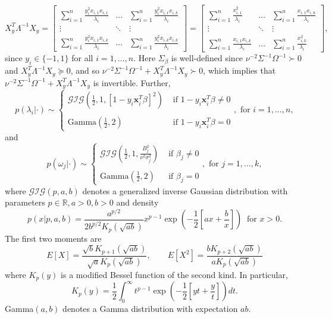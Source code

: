 \documentclass[12pt]{article}
\begin{document}
\begin{equation}
  X_{y}^T \Lambda^{-1} X_{y} = \begin{bmatrix}
    \sum_{i=1}^{n}\frac{y_i^2 x_{i,1}x_{i,1}}{\lambda_i} & \dots & \sum_{i=1}^{n}\frac{ y_i^2 x_{i,1}x_{i,k}}{\lambda_i} \\
    \vdots & \ddots & \vdots \\
    \sum_{i=1}^{n} \frac{y_i^2 x_{i,1}x_{i,k}}{\lambda_i} & \dots & \sum_{i=1}^{n}\frac{y_i^2 x_{i,k}x_{i,k}}{\lambda_i}
  \end{bmatrix} = \begin{bmatrix}
    \sum_{i=1}^{n}\frac{x_{i,1}^2}{\lambda_i} & \dots & \sum_{i=1}^{n}\frac{ x_{i,1}x_{i,k}}{\lambda_i} \\
    \vdots & \ddots & \vdots \\
    \sum_{i=1}^{n} \frac{x_{i,1}x_{i,k}}{\lambda_i} & \dots & \sum_{i=1}^{n}\frac{ x_{i,k}^2}{\lambda_i}
  \end{bmatrix},
  \label{xtlx}
\end{equation}
since $y_i \in \{-1,1\}$ for all $i = 1,\dots, n$. Here $\Sigma_{\beta}$ is well-defined since $\nu^{-2}\Sigma^{-1}\Omega^{-1} \succ 0$ and $X_{y}^T
\Lambda^{-1} X_{y} \succeq 0$, and so $\nu^{-2}\Sigma^{-1}\Omega^{-1} + X_{y}^T \Lambda^{-1} X_{y} \succ 0$, which implies that $\nu^{-2}\Sigma^{-1}\Omega^{-1} +
X_{y}^T \Lambda^{-1} X_{y}$ is invertible. Further,
\[
  p(\lambda_i|\cdot) \sim \left\{ \begin{array}{cl}
      \mathcal{GIG}\left( \frac{1}{2}, 1, [1 - y_i \bm{x}_i^T\beta]^2 \right) & \text{ if } 1-y_i \bm{x}_i^T \beta \neq 0 \\ \\
      \text{Gamma}\left( \frac{1}{2}, 2 \right) & \text{ if } 1 - y_i\bm{x}_i^T\beta = 0
  \end{array} \right., \text{ for } i=1,\dots, n,
\]
and 
\[
  p(\omega_j|\cdot) \sim \left\{ \begin{array}{cl}
      \mathcal{GIG}\left( \frac{1}{2}, 1, \frac{B_j^2}{\nu^2\sigma_j^2} \right) & \text{ if } \beta_j \neq 0 \\ \\
      \text{Gamma}\left( \frac{1}{2}, 2 \right) & \text{ if } \beta_j = 0
  \end{array} \right.,
  \text{ for } j=1,\dots,k,
\]
where $\mathcal{GIG}(p, a, b)$ denotes a generalized inverse Gaussian distribution with parameters $p \in \mathbb{R}, a > 0, b > 0$ and density
\[
  p(x|p, a, b) = \frac{a^{p/2}}{2b^{p/2}K_{p}(\sqrt{ab})}x^{p - 1}\exp\left( -\frac{1}{2}\left[ ax + \frac{b}{x} \right] \right) \ \text{ for } x > 0.
\]
The first two moments are
\[
  E[X] = \frac{\sqrt{b}K_{p+1}(\sqrt{ab})}{\sqrt{a}K_{p}(\sqrt{ab})}, \qquad E[X^2] = \frac{bK_{p+2}(\sqrt{ab})}{aK_{p}(\sqrt{ab})}
\]
where $K_{p}(y)$ is a modified Bessel function of the second kind. In particular, 
\begin{equation}
  K_p(y) = \frac{1}{2} \int_{0}^{\infty} t^{p-1}\exp\left( -\frac{1}{2}\left[yt + \frac{y}{t}\right] \right) dt.
  \label{eq1}
\end{equation}
Gamma$(a,b)$ denotes a Gamma distribution with expectation $ab$.
\end{document}
